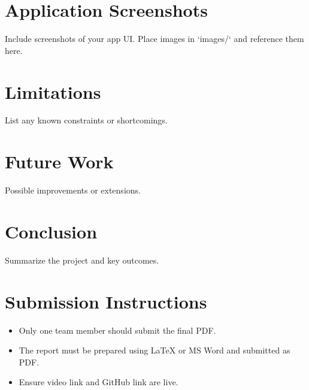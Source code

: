 \documentclass[12pt,a4paper]{report}
\begin{document}
\chapter{Application Screenshots}
Include screenshots of your app UI. Place images in `images/` and reference them here.

\chapter{Limitations}
List any known constraints or shortcomings.

\chapter{Future Work}
Possible improvements or extensions.

\chapter{Conclusion}
Summarize the project and key outcomes.

\chapter*{Submission Instructions}
\begin{itemize}
  \item Only one team member should submit the final PDF.
  \item The report must be prepared using LaTeX or MS Word and submitted as PDF.
  \item Ensure video link and GitHub link are live.
\end{itemize}

\vfill
{}
\end{document}
